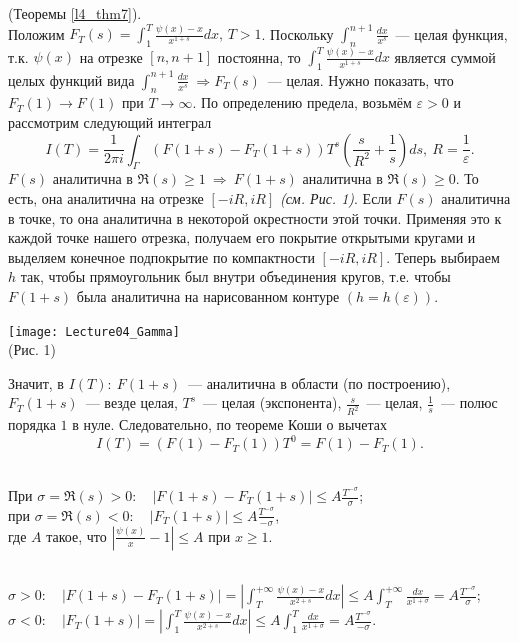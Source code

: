 \begin{pf} (Теоремы \ref{l4_thm7}).\\
	Положим $\displaystyle F_T(s) = \int_1^T \frac{\psi(x)-x}{x^{1+s}}dx, \, T>1$. Поскольку $\displaystyle \int_n^{n+1}\frac{dx}{x^s}$ — целая функция, т.к. $\psi(x)$ на отрезке $[n, n+1]$ постоянна, то $\displaystyle \int_1^T \frac{\psi(x)-x}{x^{1+s}}dx$ является суммой целых функций вида $\displaystyle \int_n^{n+1}\frac{dx}{x^s} \ \Rightarrow F_T(s)$ — целая. Нужно показать, что $F_T(1) \to F(1)$ при $T \to \infty$. По определению предела, возьмём $\varepsilon > 0$ и  рассмотрим следующий интеграл
	$$I(T) = \frac{1}{2\pi i}\int_\Gamma \left( F(1+s)-F_T(1+s) \right)T^s\left(\frac{s}{R^2}+\frac{1}{s}\right)ds, \ R = \frac{1}{\varepsilon}.$$
	$F(s)$ аналитична в $\Re(s) \geq 1 \ \Rightarrow \ F(1+s)$ аналитична в $\Re(s) \geq 0$. То есть, она аналитична на отрезке $[-iR, iR]$ \textit{(см. Рис. 1)}. Если $F(s)$ аналитична в точке, то она аналитична в некоторой окрестности этой точки. Применяя это к каждой точке нашего отрезка, получаем его покрытие открытыми кругами и выделяем конечное подпокрытие по компактности $[-iR, iR]$. Теперь выбираем $h$ так, чтобы прямоугольник был внутри объединения кругов, т.е. чтобы $F(1+s)$ была аналитична на нарисованном контуре $(h=h(\varepsilon))$.
	\begin{center}
		\texttt{[image: Lecture04\_Gamma]}~\\
		(Рис. 1)
	\end{center}
	Значит, в $I(T): \ F(1+s)$ — аналитична в области (по построению), $F_T(1+s)$ — везде целая, $T^s$ — целая (экспонента), $\displaystyle \frac{s}{R^2}$ — целая, $\displaystyle \frac{1}{s}$ — полюс порядка $1$ в нуле. Следовательно, по теореме Коши о вычетах
	$$I(T) = \left(F(1)-F_T(1)\right)T^0 = F(1)-F_T(1).$$
\end{pf}

\begin{lemma} \label{l4_lm13}~\\
	При $\displaystyle \sigma = \Re(s)>0: \quad \lvert F(1+s)-F_T(1+s) \rvert \leq A\frac{T^{-\sigma}}{\sigma}$;\\
	при $\displaystyle \sigma = \Re(s)<0: \quad \lvert F_T(1+s) \rvert \leq A\frac{T^{-\sigma}}{-\sigma}$,\\
	где $A$ такое, что $\displaystyle \left| \frac{\psi(x)}{x}-1 \right| \leq A$ при $x \geq 1$.
\end{lemma}
\begin{pf}~\\
	$\displaystyle \sigma>0: \quad \left| F(1+s)-F_T(1+s) \right| = \left| \int_T^{+\infty}\frac{\psi(x)-x}{x^{2+s}}dx \right| \leq A\int_T^{+\infty}\frac{dx}{x^{1+\sigma}} = A\frac{T^{-\sigma}}{\sigma}$;\\
	$\displaystyle \sigma<0: \quad \left| F_T(1+s) \right| = \left| \int_1^T\frac{\psi(x)-x}{x^{2+s}}dx \right| \leq A\int_1^T\frac{dx}{x^{1+\sigma}} = A\frac{T^{-\sigma}}{-\sigma}$.
\end{pf}